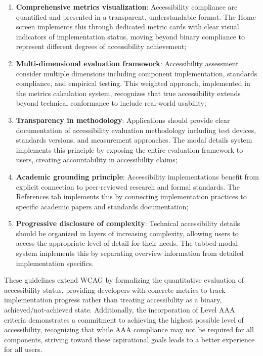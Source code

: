 \begin{enumerate}
    \item \textbf{Comprehensive metrics visualization}: Accessibility compliance are quantified and presented in a transparent, understandable format. The Home screen implements this through dedicated metric cards with clear visual indicators of implementation status, moving beyond binary compliance to represent different degrees of accessibility achievement;
    
    \item \textbf{Multi-dimensional evaluation framework}: Accessibility assessment consider multiple dimensions including component implementation, standards compliance, and empirical testing. This weighted approach, implemented in the metrics calculation system, recognizes that true accessibility extends beyond technical conformance to include real-world usability;
    
    \item \textbf{Transparency in methodology}: Applications should provide clear documentation of accessibility evaluation methodology including test devices, standards versions, and measurement approaches. The modal details system implements this principle by exposing the entire evaluation framework to users, creating accountability in accessibility claims;
    
    \item \textbf{Academic grounding principle}: Accessibility implementations benefit from explicit connection to peer-reviewed research and formal standards. The References tab implements this by connecting implementation practices to specific academic papers and standards documentation;
    
    \item \textbf{Progressive disclosure of complexity}: Technical accessibility details should be organized in layers of increasing complexity, allowing users to access the appropriate level of detail for their needs. The tabbed modal system implements this by separating overview information from detailed implementation specifics.
\end{enumerate}

These guidelines extend WCAG by formalizing the quantitative evaluation of accessibility status, providing developers with concrete metrics to track implementation progress rather than treating accessibility as a binary, achieved/not-achieved state. Additionally, the incorporation of Level AAA criteria demonstrates a commitment to achieving the highest possible level of accessibility, recognizing that while AAA compliance may not be required for all components, striving toward these aspirational goals leads to a better experience for all users.

